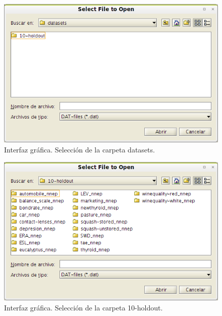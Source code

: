 		\begin{figure}[htbp]
			\centering
			\includegraphics[scale=0.6]{interfaz/interface04.png}
			\caption{Interfaz gráfica. Selección de la carpeta datasets.}
			\label{fig:int04}
		\end{figure}
		
		\begin{figure}[htbp]
			\centering
			\includegraphics[scale=0.6]{interfaz/interface05.png}
			\caption{Interfaz gráfica. Selección de la carpeta 10-holdout.}
			\label{fig:int05}
		\end{figure}
		
